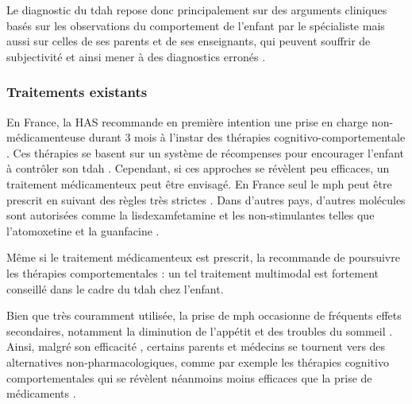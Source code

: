 Le diagnostic du \gls{tdah} repose donc principalement sur des arguments cliniques basés sur les observations du comportement de l'enfant par le spécialiste 
mais aussi sur celles de ses parents et de ses enseignants, qui peuvent souffrir de
subjectivité et ainsi mener à des diagnostics erronés \citep{Lambez2019}.

\subsubsection{Traitements existants} \label{traitements_existants}

En France, la HAS recommande en première intention une prise en charge non-médicamenteuse durant 3 mois à l'instar des thérapies cognitivo-comportementale \citep{HAS}. 
Ces thérapies se basent sur un système de récompenses pour encourager l'enfant à contrôler son \gls{tdah} \citep{Evans2011, Sonuga2004}.
Cependant, si ces approches se révèlent peu efficaces, un traitement médicamenteux peut être envisagé. En France seul le \gls{mph}
peut être prescrit en suivant des règles très strictes \citep{HAS}. Dans d'autres pays, d'autres molécules sont autorisées comme la lisdexamfetamine et 
les non-stimulantes telles que l'atomoxetine et la guanfacine \citep{Luan2017}.

Même si le traitement médicamenteux est prescrit, la \citet{HAS} recommande de poursuivre les thérapies comportementales : un tel traitement multimodal 
est fortement conseillé dans le cadre du \gls{tdah} chez l'enfant.

Bien que très couramment utilisée,  la prise de \gls{mph} occasionne de fréquents effets secondaires,
notamment la diminution de l'appétit et des troubles du sommeil \citep{Sousa2012}. Ainsi, malgré son efficacité \citep{Taylor2014,
Storebo2015, Swanson2017}, certains parents et médecins se tournent vers des alternatives non-pharmacologiques, comme par exemple les thérapies cognitivo 
comportementales \citep{Berger2008} qui se révèlent néanmoins
moins efficaces que la prise de médicaments \citep{Sonuga-Barke2013}. 

